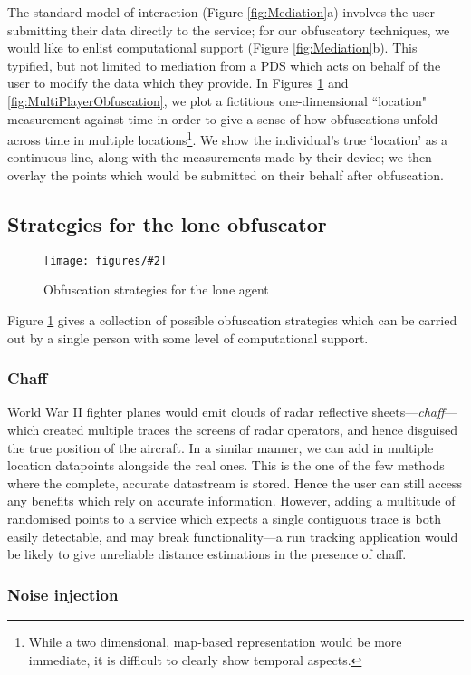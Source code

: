 \documentclass{IOS-Book-Article}     %
\newcommand{\fig}[3][0.9]{
\begin{figure}[tp]
\begin{center}
\texttt{[image: figures/\#2]}
\caption{#3}
\label{fig:#2}
\end{center}
\end{figure}
}
\begin{document}
The standard model of interaction (Figure \ref{fig:Mediation}a) involves the
user submitting their data directly to the service; for our obfuscatory
techniques, we would like to enlist computational support (Figure
\ref{fig:Mediation}b). This typified, but not limited to mediation from a PDS
which acts on behalf of the user to modify the data which they provide.
In Figures \ref{fig:SinglePlayerObfuscation} and
\ref{fig:MultiPlayerObfuscation}, we plot a fictitious one-dimensional
``location" measurement against time in order to give a sense of how
obfuscations unfold across time in multiple locations\footnote{While a two
dimensional, map-based representation would be more immediate, it is difficult
to clearly show temporal aspects.}. We show the individual's true `location' as
a continuous line, along with the measurements made by their device; we then
overlay the points which would be submitted on their behalf after obfuscation.

\subsection{Strategies for the lone obfuscator}

\fig[1.05]{SinglePlayerObfuscation}{Obfuscation strategies for the lone agent}

Figure \ref{fig:SinglePlayerObfuscation} gives a collection of possible
obfuscation strategies which can be carried out by a single person with some
level of computational support.

\subsubsection{Chaff}

World War II fighter planes would emit clouds of radar reflective
sheets---\emph{chaff}---which created multiple traces the screens of radar
operators, and hence disguised the true position of the aircraft. In a similar
manner, we can add in multiple location datapoints alongside the real ones. This
is the one of the few methods where the complete, accurate datastream is stored.
Hence the user can still access any benefits which rely on accurate information. However,
adding a multitude of randomised points to a service which expects a single
contiguous trace is both easily detectable, and may break functionality---a
run tracking application would be likely to give unreliable distance estimations
in the presence of chaff.

\subsubsection{Noise injection}
\end{document}
